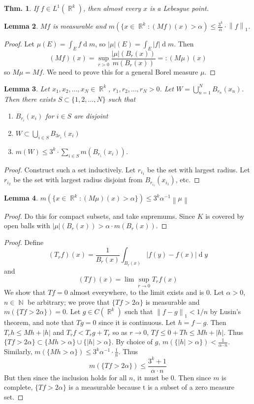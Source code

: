 \documentclass[12pt, a4paper]{book}
\DeclareMathOperator{\N}{\mathbb{N}}
\DeclareMathOperator{\R}{\mathbb{R}}
\renewcommand{\d}[1]{\ensuremath{\operatorname{d}\!{#1}}} %
\newcommand{\norm}[1]{\left\lVert#1\right\rVert} %
\newtheorem{theorem}{Thm.}[section]
\newtheorem{lemma}[theorem]{Lemma}
\theoremstyle{nonumberplain}
\newtheorem{proof}{Proof}
\begin{document}
\begin{theorem}
    If $f\in L^1(\R^k)$, then almost every $x$ is a Lebesgue point.
\end{theorem}
\begin{lemma}
    $Mf$ is measurable and $m(\{x\in\R^k:(Mf)(x)>\alpha)\leq\frac{3^k}{\alpha}\cdot\norm{f}_1$.
\end{lemma}
\begin{proof}
    Let $\mu(E)=\int_E f\d{m}$, so $|\mu|(E)=\int_E |f|\d{m}$.
    Then
    \[(Mf)(x)=\sup_{r>0}\frac{|\mu|(B_r(x))}{m(B_r(x))}=:(M\mu)(x)\]
    so $M\mu=Mf$.
    We need to prove this for a general Borel measure $\mu$.
\end{proof}
\begin{lemma}
    Let $x_1,x_2,\ldots,x_N\in\R^k$, $r_1,r_2,\ldots,r_N>0$.
    Let $W=\bigcup_{n=1}^N B_{r_n}(x_n)$.
    Then there exists $S\subset\{1,2,\ldots,N\}$ such that
    \begin{enumerate}[nolistsep]
        \item $B_{r_i}(x_i)$ for $i\in S$ are disjoint
        \item $W\subset\bigcup_{i\in S}B_{3r_i}(x_i)$
        \item $m(W)\leq 3^k\cdot\sum_{i\in S}m(B_{r_i}(x_i))$.
    \end{enumerate}
\end{lemma}
\begin{proof}
    Construct such a set inductively.
    Let $r_{i_1}$ be the set with largest radius.
    Let $r_{i_2}$ be the set with largest radius disjoint from $B_{r_{i_1}}(x_{i_1})$, etc.
\end{proof}
\begin{lemma}
    $m(\{x\in \R^k:(M\mu)(x)>\alpha\})\leq 3^k\alpha^{-1}\norm{\mu}$
\end{lemma}
\begin{proof}
    Do this for compact subsets, and take supremums.
    Since $K$ is covered by open balls with $|\mu|(B_r(x))>\alpha\cdot m(B_r(x))$.
\end{proof}
\begin{proof}
    Define
    \[(T_rf)(x)=\frac{1}{B_r(x)}\int_{B_r(x)}|f(y)-f(x)|\d{y}\]
    and
    \[(Tf)(x)=\lim\sup_{r\to 0}T_rf(x)\]
    We show that $Tf=0$ almost everywhere, to the limit exists and is 0.
    Let $\alpha>0$, $n\in\N$ be arbitrary; we prove that $\{Tf>2\alpha\}$ is measurable and $m(\{Tf>2\alpha\})=0$.
    Let $g\in C(\R^k)$ such that $\norm{f-g}_1<1/n$ by Lusin's theorem, and note that $Tg=0$ since it is continuous.
    Let $h=f-g$.
    Then $T_rh\leq Mh+|h|$ and $T_rf<T_rg+T_r$ so as $r\to 0$, $Tf\leq0+Th\leq Mh+|h|$.
    Thus $\{Tf>2\alpha\}\subset\{Mh>\alpha\}\cup\{|h|>\alpha\}$.
    By choice of $g$, $m(\{|h|>\alpha\})<\frac{1}{\alpha\cdot n}$.
    Similarly, $m(\{Mh>\alpha\})\leq 3^k\alpha^{-1}\cdot\frac{1}{n}$.
    Thus
    \[m(\{Tf>2\alpha\})\leq\frac{3^k+1}{\alpha\cdot n}\]
    But then since the inclusion holds for all $n$, it must be 0.
    Then since $m$ is complete, $\{Tf>2\alpha\}$ is a measurable because t is a subset of a zero measure set.
\end{proof}
\end{document}
